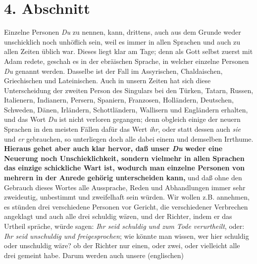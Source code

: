 \section{4. Abschnitt} \label{kap10_ab4}

Einzelne Personen \textit{Du} zu nennen, kann, drittens, auch aus dem Grunde
weder
unschicklich noch unhöflich sein, weil es immer in allen Sprachen und auch zu
allen Zeiten üblich war. Dieses liegt klar am Tage; denn als Gott selbst zuerst
mit Adam redete, geschah es in der ebräischen Sprache, in welcher einzelne
Personen \textit{Du} genannt werden. Dasselbe ist der Fall im
Assyrischen,
Chaldaischen, Griechischen
und Lateinischen. Auch in unsern Zeiten hat sich
diese Unterscheidung der zweiten Person des Singulars bei den
Türken, Tatarn,
Russen, Italienern,
Indianern, Persern,
Spaniern, Franzosen,
Holländern,
Deutschen, Schweden,
Dänen, Irländern,
Schottländern, Wallisern
 und Engländern erhalten, und das Wort \textit{Du}
ist nicht verloren gegangen;
denn obgleich einige der neuern Sprachen in den meisten Fällen dafür das Wert
\textit{ihr}, oder statt dessen auch \textit{sie} und \textit{er} gebrauchen, so
unterliegen
doch alle dabei einem und demselben Irrthume. \textbf{Hieraus gehet aber auch
klar
hervor, daß unser \textit{Du} weder eine Neuerung noch Unschieklichkeit, sondern
vielmehr in allen Sprachen das einzige schickliche Wart ist, wodurch man
einzelne Personen von mehrern in der Anrede gehörig unterscheiden kann,} und daß
ohne den Gebrauch dieses Wortes alle Aussprache, Reden und Abhandlungen immer
sehr zweideutig, unbestimmt und zweifelhaft sein würden. Wir wollen z.B.
annehmen, es stünden drei verschiedene Personen vor Gericht, die verschiedener
Verbrechen angeklagt und auch alle drei schuldig wären, und der Richter, indem
er das Urtheil spräche, würde sagen: \textit{Ihr seid schuldig und zum Tode
verurtheilt},
oder: \textit{Ihr seid unschuldig und freigesprochen}; wie könnte man wissen,
wer hier
schuldig oder unschuldig wäre? ob der Richter nur einen, oder zwei, oder
vielleicht alle drei gemeint habe. Darum werden auch unsere (englischen)
